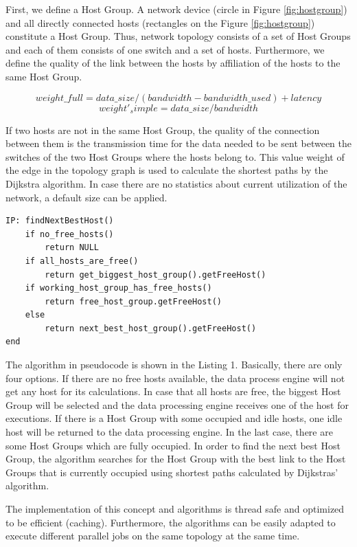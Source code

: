 First, we define a Host Group. A network device (circle in Figure \ref{fig:hostgroup}) and all
directly connected hosts (rectangles on the Figure \ref{fig:hostgroup}) constitute a Host Group.
Thus, network topology consists of a set of Host Groups and each of them consists of one switch and
a set of hosts. Furthermore, we define the quality of the link between the hosts by affiliation of
the hosts to the same Host Group.

\begin{equation}
    weight\_full = data\_size / (bandwidth - bandwidth\_used) + latency
\end{equation}
\begin{equation}
    weight'_simple = data\_size / bandwidth
\end{equation}

If two hosts are not in the same Host Group, the quality of the connection between them is the
transmission time for the data needed to be sent between the switches of the two Host Groups where
the hosts belong to. This value weight of the edge in the topology graph is used to calculate the
shortest paths by the Dijkstra algorithm. In case there are no statistics about current utilization
of the network, a default size can be applied.\\

\begin{lstlisting}[caption=Algorithm of finding free hosts based on Host Group concept]
IP: findNextBestHost()
    if no_free_hosts()
        return NULL
    if all_hosts_are_free()
        return get_biggest_host_group().getFreeHost()
    if working_host_group_has_free_hosts()
        return free_host_group.getFreeHost()
    else
        return next_best_host_group().getFreeHost()
end
\end{lstlisting}

The algorithm in pseudocode is shown in the Listing 1. Basically, there are only four options. If
there are no free hosts available, the data process engine will not get any host for its
calculations. In case that all hosts are free, the biggest Host Group will be selected and the data
processing engine receives one of the host for executions. If there is a Host Group with some
occupied and idle hosts, one idle host will be returned to the data processing engine. In the last
case, there are some Host Groups which are fully occupied. In order to find the next best Host
Group, the algorithm searches for the Host Group with the best link to the Host Groups that is
currently occupied using shortest paths calculated by Dijkstras’ algorithm.

The implementation of this concept and algorithms is thread safe and optimized to be efficient
(caching). Furthermore, the algorithms can be easily adapted to execute different parallel jobs on
the same topology at the same time.

